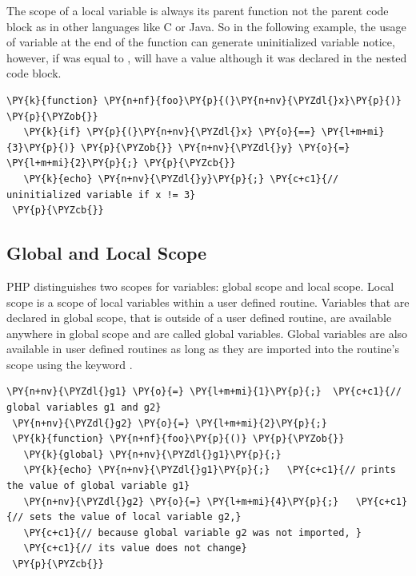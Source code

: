     The scope of a local variable is always its parent function not the 
    parent code block as in other languages like C or Java. 
    So in the following 
    example, the usage of variable  at the end 
    of the function can generate uninitialized variable notice, 
    however, if  was equal to , 
     will have a value although it 
    was declared in the nested code block.

\begin{Verbatim}[commandchars=\\\{\}]
 \PY{k}{function} \PY{n+nf}{foo}\PY{p}{(}\PY{n+nv}{\PYZdl{}x}\PY{p}{)} \PY{p}{\PYZob{}}
   \PY{k}{if} \PY{p}{(}\PY{n+nv}{\PYZdl{}x} \PY{o}{==} \PY{l+m+mi}{3}\PY{p}{)} \PY{p}{\PYZob{}} \PY{n+nv}{\PYZdl{}y} \PY{o}{=} \PY{l+m+mi}{2}\PY{p}{;} \PY{p}{\PYZcb{}}
   \PY{k}{echo} \PY{n+nv}{\PYZdl{}y}\PY{p}{;} \PY{c+c1}{// uninitialized variable if x != 3}
 \PY{p}{\PYZcb{}}
\end{Verbatim}
    
    \subsection{Global and Local Scope}
    PHP distinguishes two scopes for variables: global scope and 
    local scope. Local scope is a scope of local variables 
    within a user defined routine.         
    Variables that are declared 
    in global scope, that is outside of a user defined routine, 
    are available anywhere in global scope and are called 
    global variables. Global variables are also available 
    in user defined routines as long as they are imported 
    into the routine's scope using the keyword .
    
\begin{Verbatim}[commandchars=\\\{\}]
 \PY{n+nv}{\PYZdl{}g1} \PY{o}{=} \PY{l+m+mi}{1}\PY{p}{;}  \PY{c+c1}{// global variables g1 and g2}
 \PY{n+nv}{\PYZdl{}g2} \PY{o}{=} \PY{l+m+mi}{2}\PY{p}{;}
 \PY{k}{function} \PY{n+nf}{foo}\PY{p}{()} \PY{p}{\PYZob{}}
   \PY{k}{global} \PY{n+nv}{\PYZdl{}g1}\PY{p}{;}
   \PY{k}{echo} \PY{n+nv}{\PYZdl{}g1}\PY{p}{;}   \PY{c+c1}{// prints the value of global variable g1}
   \PY{n+nv}{\PYZdl{}g2} \PY{o}{=} \PY{l+m+mi}{4}\PY{p}{;}   \PY{c+c1}{// sets the value of local variable g2,}
   \PY{c+c1}{// because global variable g2 was not imported, }
   \PY{c+c1}{// its value does not change}
 \PY{p}{\PYZcb{}}
\end{Verbatim}

